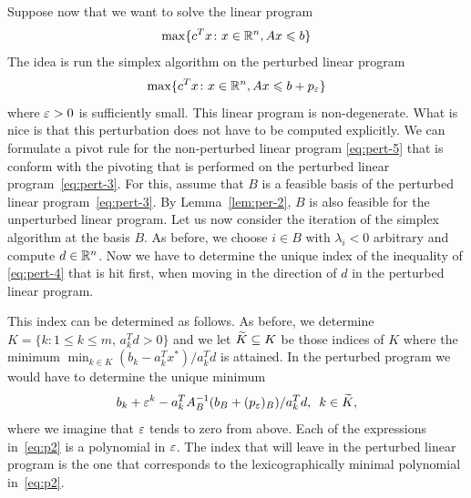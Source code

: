 Suppose now that we want to solve the linear program
\begin{equation}
  \label{eq:pert-5}
  \max\{c^Tx \colon x \in \mathbb{R}^n, Ax \leqslant b \}
\end{equation}
The idea is run the simplex algorithm  on the perturbed linear program 
\begin{equation}
  \label{eq:pert-4}
  \max\{c^Tx \colon x \in \mathbb{R}^n, Ax \leqslant b+p_{\varepsilon} \}
\end{equation}
where ${\varepsilon}>0$ is sufficiently small. This linear program is
non-degenerate. What is nice is that this perturbation does not have
to be computed explicitly. We can formulate a pivot rule for the
non-perturbed linear program \eqref{eq:pert-5} that is conform with the pivoting that is
performed on the perturbed linear program~\eqref{eq:pert-3}. For this, assume that $B$ is a feasible basis of the perturbed linear program~\eqref{eq:pert-3}. By  Lemma~\ref{lem:per-2}, $B$ is also feasible for the unperturbed linear program. Let us now consider the iteration of the simplex algorithm at the basis $B$. As before, we choose $i \in B$ with $\lambda_i<0$ arbitrary and compute $d \in \mathbb{R}^n$. Now we have to determine the unique index of the inequality of \eqref{eq:pert-4} that is hit first, when moving in the direction of $d$ in the perturbed linear program. 

This index can be determined as follows. As before, we determine  $K = \{ k \colon 1 \leq k \leq m, \, a_k^Td >0\}$ and we let $\widetilde{K}\subseteq K $ be those indices of $K$ where the minimum $\min_{k \in K} (b_k - a_k^Tx^*)/a_k^Td$ is attained. In the perturbed program we would have to determine the unique minimum 
\begin{equation}\label{eq:p2}
  b_k + {\varepsilon}^k  - a_k^T A_B^{-1} (b_B + (p_{\varepsilon})_B)/a_k^Td, \,\,\, k \in \widetilde{K},
\end{equation}
where we imagine that ${\varepsilon}$ tends to zero from above.  Each of the expressions in~\eqref{eq:p2} is a polynomial in ${\varepsilon}$. The index that will leave in the perturbed linear program is the one that corresponds to the lexicographically minimal polynomial in~\eqref{eq:p2}. 





